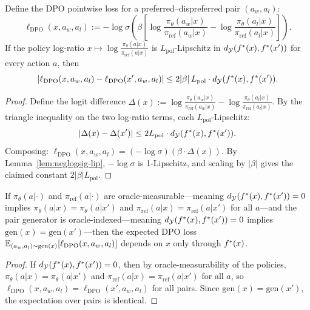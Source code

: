 \begin{lemma}\label{lem:dpo-lip}
Define the DPO pointwise loss for a preferred--dispreferred pair $(a_w, a_l)$:
\[
\ell_{\mathrm{DPO}}(x, a_w, a_l) := -\log\sigma\!\left(\beta\left[\log\frac{\pi_\theta(a_w|x)}{\pi_{\mathrm{ref}}(a_w|x)} - \log\frac{\pi_\theta(a_l|x)}{\pi_{\mathrm{ref}}(a_l|x)}\right]\right).
\]
If the policy log-ratio $x \mapsto \log\frac{\pi_\theta(a|x)}{\pi_{\mathrm{ref}}(a|x)}$ is $L_{\mathrm{pol}}$-Lipschitz in $d_{\mathcal{Y}}(f^\ast(x), f^\ast(x'))$ for every action $a$, then
\[
|\ell_{\mathrm{DPO}}(x, a_w, a_l) - \ell_{\mathrm{DPO}}(x', a_w, a_l)| \le 2|\beta|\, L_{\mathrm{pol}} \cdot d_{\mathcal{Y}}(f^\ast(x), f^\ast(x')).
\]
\end{lemma}

\begin{proof}
Define the logit difference $\Delta(x) := \log\frac{\pi_\theta(a_w|x)}{\pi_{\mathrm{ref}}(a_w|x)} - \log\frac{\pi_\theta(a_l|x)}{\pi_{\mathrm{ref}}(a_l|x)}$. By the triangle inequality on the two log-ratio terms, each $L_{\mathrm{pol}}$-Lipschitz:
\[
|\Delta(x) - \Delta(x')| \le 2 L_{\mathrm{pol}} \cdot d_{\mathcal{Y}}(f^\ast(x), f^\ast(x')).
\]
Composing: $\ell_{\mathrm{DPO}}(x, a_w, a_l) = (-\log\sigma)(\beta \cdot \Delta(x))$. By Lemma~\ref{lem:neglogsig-lip}, $-\log\sigma$ is 1-Lipschitz, and scaling by $|\beta|$ gives the claimed constant $2|\beta| L_{\mathrm{pol}}$.
\end{proof}

\begin{lemma}\label{lem:dpo-oracle-meas}
If $\pi_\theta(a|\cdot)$ and $\pi_{\mathrm{ref}}(a|\cdot)$ are oracle-measurable---meaning $d_{\mathcal{Y}}(f^\ast(x), f^\ast(x')) = 0$ implies $\pi_\theta(a|x) = \pi_\theta(a|x')$ and $\pi_{\mathrm{ref}}(a|x) = \pi_{\mathrm{ref}}(a|x')$ for all $a$---and the pair generator is oracle-indexed---meaning $d_{\mathcal{Y}}(f^\ast(x), f^\ast(x')) = 0$ implies $\mathrm{gen}(x) = \mathrm{gen}(x')$---then the expected DPO loss $\mathbb{E}_{(a_w,a_l) \sim \mathrm{gen}(x)}[\ell_{\mathrm{DPO}}(x, a_w, a_l)]$ depends on $x$ only through $f^\ast(x)$.
\end{lemma}

\begin{proof}
If $d_{\mathcal{Y}}(f^\ast(x), f^\ast(x')) = 0$, then by oracle-measurability of the policies, $\pi_\theta(a|x) = \pi_\theta(a|x')$ and $\pi_{\mathrm{ref}}(a|x) = \pi_{\mathrm{ref}}(a|x')$ for all $a$, so $\ell_{\mathrm{DPO}}(x, a_w, a_l) = \ell_{\mathrm{DPO}}(x', a_w, a_l)$ for all pairs. Since $\mathrm{gen}(x) = \mathrm{gen}(x')$, the expectation over pairs is identical.
\end{proof}

